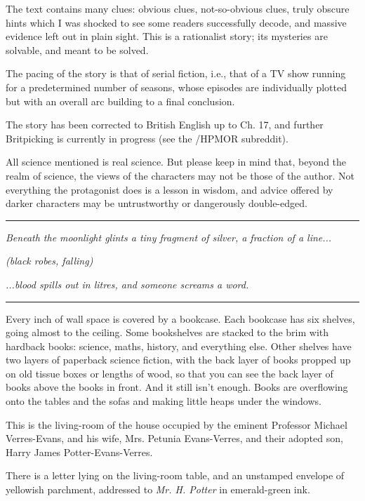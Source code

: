 The text contains many clues: obvious clues, not-so-obvious clues, truly
obscure hints which I was shocked to see some readers successfully
decode, and massive evidence left out in plain sight. This is a
rationalist story; its mysteries are solvable, and meant to be solved.

The pacing of the story is that of serial fiction, i.e., that of a TV
show running for a predetermined number of seasons, whose episodes are
individually plotted but with an overall arc building to a final
conclusion.

The story has been corrected to British English up to Ch. 17, and
further Britpicking is currently in progress (see the /HPMOR subreddit).

All science mentioned is real science. But please keep in mind that,
beyond the realm of science, the views of the characters may not be
those of the author. Not everything the protagonist does is a lesson in
wisdom, and advice offered by darker characters may be untrustworthy or
dangerously double-edged.

\begin{center}\rule{3in}{0.4pt}\end{center}

\emph{Beneath the moonlight glints a tiny fragment of silver, a fraction
of a line...}

\emph{(black robes, falling)}

\emph{...blood spills out in litres, and someone screams a word.}

\begin{center}\rule{3in}{0.4pt}\end{center}

Every inch of wall space is covered by a bookcase. Each bookcase has six
shelves, going almost to the ceiling. Some bookshelves are stacked to
the brim with hardback books: science, maths, history, and everything
else. Other shelves have two layers of paperback science fiction, with
the back layer of books propped up on old tissue boxes or lengths of
wood, so that you can see the back layer of books above the books in
front. And it still isn't enough. Books are overflowing onto the tables
and the sofas and making little heaps under the windows.

This is the living-room of the house occupied by the eminent Professor
Michael Verres-Evans, and his wife, Mrs. Petunia Evans-Verres, and their
adopted son, Harry James Potter-Evans-Verres.

There is a letter lying on the living-room table, and an unstamped
envelope of yellowish parchment, addressed to \emph{Mr. H. Potter} in
emerald-green ink.

